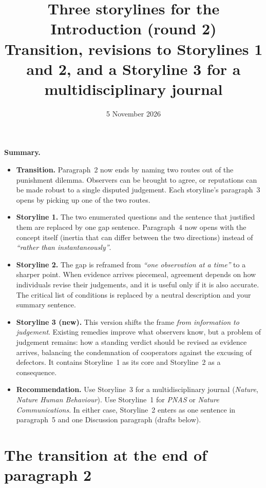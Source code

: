 \documentclass[11pt]{article}
\title{\large\bfseries Three storylines for the Introduction (round 2)\\[0.2em]
\normalsize Transition, revisions to Storylines 1 and 2, and a Storyline 3 for a multidisciplinary journal}
\date{5 November 2026}
\newcommand{\old}[1]{\textit{``#1''}}
\begin{document}
\maketitle
\vspace{-1.5em}

\begin{keypoint}
\textbf{Summary.}
\begin{itemize}[leftmargin=1.2em]
\item \textbf{Transition.} Paragraph~2 now ends by naming two routes out of the punishment dilemma. Observers can be brought to agree, or reputations can be made robust to a single disputed judgement. Each storyline's paragraph~3 opens by picking up one of the two routes.
\item \textbf{Storyline 1.} The two enumerated questions and the sentence that justified them are replaced by one gap sentence. Paragraph~4 now opens with the concept itself (inertia that can differ between the two directions) instead of \old{rather than instantaneously}.
\item \textbf{Storyline 2.} The gap is reframed from \old{one observation at a time} to a sharper point. When evidence arrives piecemeal, agreement depends on how individuals revise their judgements, and it is useful only if it is also accurate. The critical list of conditions is replaced by a neutral description and your summary sentence.
\item \textbf{Storyline 3 (new).} This version shifts the frame \emph{from information to judgement}. Existing remedies improve what observers know, but a problem of judgement remains: how a standing verdict should be revised as evidence arrives, balancing the condemnation of cooperators against the excusing of defectors. It contains Storyline~1 as its core and Storyline~2 as a consequence.
\item \textbf{Recommendation.} Use Storyline~3 for a multidisciplinary journal (\textit{Nature}, \textit{Nature Human Behaviour}). Use Storyline~1 for \textit{PNAS} or \textit{Nature Communications}. In either case, Storyline~2 enters as one sentence in paragraph~5 and one Discussion paragraph (drafts below).
\end{itemize}
\end{keypoint}

\section{The transition at the end of paragraph 2}
\end{document}
